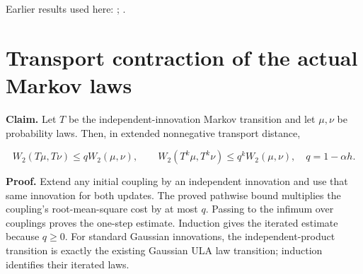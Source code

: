 \documentclass[11pt,a4paper]{article}
\begin{document}
Earlier results used here: \cite[Section~3.10.7]{LangevinLean2026ULASC}; \cite[Section~3.34.1]{LangevinLean2026ULASC}.

\section{\texorpdfstring{Transport contraction of the actual Markov laws}{Transport contraction of the actual Markov laws}}


\textbf{Claim.} Let \(T\) be the independent-innovation Markov transition and let \(\mu,\nu\) be probability laws. Then, in extended nonnegative transport distance,

\[W_2(T\mu,T\nu)\le qW_2(\mu,\nu),\qquad
W_2(T^k\mu,T^k\nu)\le q^kW_2(\mu,\nu),\quad q=1-\alpha h.\]


\textbf{Proof.} Extend any initial coupling by an independent innovation and use that same innovation for both updates. The proved pathwise bound multiplies the coupling's root-mean-square cost by at most \(q\). Passing to the infimum over couplings proves the one-step estimate. Induction gives the iterated estimate because \(q\ge0\). For standard Gaussian innovations, the independent-product transition is exactly the existing Gaussian ULA law transition; induction identifies their iterated laws.
\end{document}
